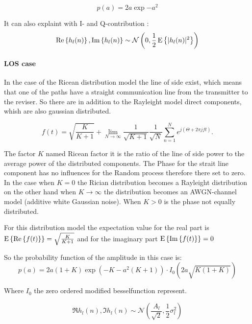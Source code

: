 \begin{equation} \label{eqn:rayleight_fading_probabilety_dencety}
	p(a)= 2a\exp{{-a}^2}
\end{equation}

It can also explaint with I- and Q-contribution :
\begin{equation}
	\mathrm{Re} \left\{h_l(n)\right\}, \mathrm{Im} \left\{h_l(n)\right\}
	\sim \mathcal{N} \left(0, \frac{1}{2} \operatorname{E} \left\{|h_l(n)|^2\right\} \right)
\end{equation}
\skelpar[4]

\paragraph{LOS case}


In the case of the Ricean distribution model the line of side exist, which means that one of the paths have a straight communication line from the transmitter to the reviser. So there are in addition to the Rayleight model direct components, whish are also gaussian distributed.

\begin{equation} \label{eqn:rician fading}
	f(t) = \sqrt{\frac{K}{K+1}}+\lim_{N\rightarrow\infty}\frac{1}{\sqrt{K+1}} \frac{1}{\sqrt{N}}\sum_{n=1}^{N} e^{j(\Theta +2\pi jf t)}.
\end{equation}  

The factor \(K\) named Ricean factor it is the ratio of the line of side power to the average power of the distributed components.
The Phase for the strait line component has no influences for the Random process therefore there set to zero. In the case when \(K = 0 \)
the Rician distribution becomes a Rayleight distribution on the other hand when \(K\rightarrow \infty \) the distribution becomes an AWGN-channel model (additive white Gaussian noise). When \(K > 0 \) is the phase not equally distributed.

For this distribution model the expectation value for the real part is \(\operatorname{E} \left\{\mathrm{Re} \left\{f(t)\right\}\right\}=\sqrt{\frac{K}{K+1}} \) and for the imaginary part \(\operatorname{E} \left\{\mathrm{Im} \left\{f(t)\right\}\right\}=0\) 

So the probability function of the amplitude in this case is:
\begin{equation} \label{eqn:rician_fading_probabilety_dencety}
	p(a)= 2a(1+K)\exp{(-K-{a}^2(K+1))}\cdot I_0(2a\sqrt{K(1+K)})
\end{equation}

Where \(I_0\) the zero ordered modified besselfunction represent.

\begin{equation}
	\Re{h_l(n)}, \Im{h_l(n)}
	\sim \mathcal{N} \left( \frac{A_l}{\sqrt{2}}, \frac{1}{2} \sigma_l^2 \right)
\end{equation}
\skelpar[4]
